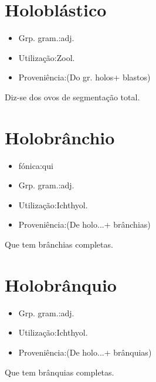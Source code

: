 \documentclass{article}
\begin{document}
\section{Holoblástico}
\begin{itemize}
\item {Grp. gram.:adj.}
\end{itemize}
\begin{itemize}
\item {Utilização:Zool.}
\end{itemize}
\begin{itemize}
\item {Proveniência:(Do gr. \textunderscore holos\textunderscore  + \textunderscore blastos\textunderscore )}
\end{itemize}
Diz-se dos ovos de segmentação total.
\section{Holobrânchio}
\begin{itemize}
\item {fónica:qui}
\end{itemize}
\begin{itemize}
\item {Grp. gram.:adj.}
\end{itemize}
\begin{itemize}
\item {Utilização:Ichthyol.}
\end{itemize}
\begin{itemize}
\item {Proveniência:(De \textunderscore holo...\textunderscore  + \textunderscore brânchias\textunderscore )}
\end{itemize}
Que tem brânchias completas.
\section{Holobrânquio}
\begin{itemize}
\item {Grp. gram.:adj.}
\end{itemize}
\begin{itemize}
\item {Utilização:Ichthyol.}
\end{itemize}
\begin{itemize}
\item {Proveniência:(De \textunderscore holo...\textunderscore  + \textunderscore brânquias\textunderscore )}
\end{itemize}
Que tem brânquias completas.
\end{document}
